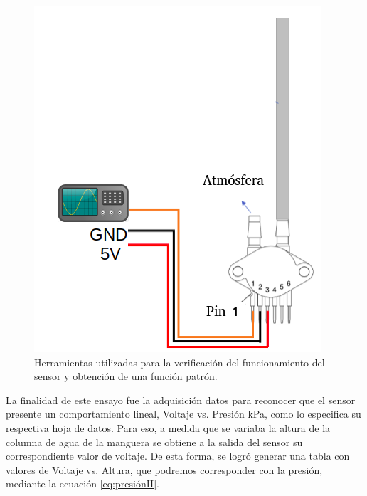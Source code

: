 \begin{figure}[htpb]
	\centering
	\includegraphics[scale=.50]{./Figures/PruebasDelSensor-FuncionPatron.png}
	\caption{Herramientas utilizadas para la verificación del funcionamiento del sensor y obtención de una función patrón. }
\label{fig:Pruebas del sensor-Funcion patron.png}
\end{figure}

La finalidad de este ensayo fue la adquisición datos para reconocer que el sensor presente un comportamiento lineal, Voltaje vs. Presión kPa, como lo especifica su respectiva hoja de datos. Para eso, a medida que se variaba	la altura de la columna de agua de la manguera se obtiene a la salida del sensor su correspondiente valor de voltaje. De esta forma, se logró generar una tabla con valores de Voltaje vs. Altura, que podremos corresponder con la presión, mediante la ecuación \ref{eq:presiónII}.
    
